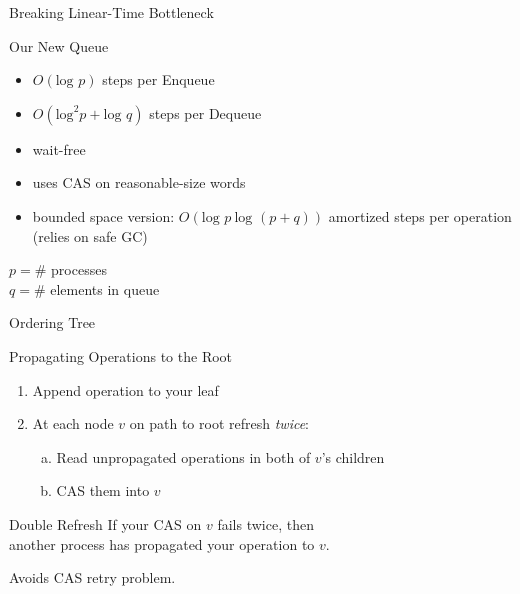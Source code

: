 \documentclass[compress]{beamer}
\newcommand{\op}[1]{\mbox{\sc #1}}
\renewcommand{\log}{\mbox{log }} %
\begin{document}
\begin{frame}{Breaking Linear-Time Bottleneck}

\begin{block}{Our New Queue}
\begin{itemize}
\item $O(\log p)$ steps per \op{Enqueue}
\item $O(\mbox{log}^2 p + \log q)$ steps per \op{Dequeue}
\item wait-free
\item uses CAS on reasonable-size words
\item bounded space version: $O(\log p\ \log(p+q))$ amortized steps per operation
(relies on safe GC)
\end{itemize}
\end{block}

$p = \#$ processes\\
$q = \#$ elements in queue

%

\end{frame}

\begin{frame}{Ordering Tree}

\hspace*{-7mm}
\only<2>{}%
\only<3>{}%

\end{frame}

\begin{frame}{Propagating Operations to the Root}

\begin{enumerate}
\item
Append operation to your leaf
\item
At each node $v$ on path to root refresh {\it twice}:
\begin{enumerate}[(a)]
\item
Read unpropagated operations in both of $v$'s children
\item
CAS them into $v$
\end{enumerate}
\end{enumerate}

\pause
\medskip

\begin{block}{Double Refresh}
If your CAS on $v$ fails twice, then\\
another process has propagated your operation to $v$.
\end{block}

\pause
\medskip
Avoids CAS retry problem.
\end{frame}
\end{document}
